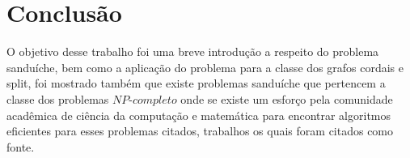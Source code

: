 \section{Conclusão}

O objetivo desse trabalho foi uma breve introdução a respeito do problema sanduíche, bem como a aplicação do problema para a classe dos grafos cordais e split, foi mostrado também que existe problemas sanduíche que pertencem a classe dos problemas $NP$-$completo$ onde se existe um esforço pela comunidade acadêmica de ciência da computação e matemática para encontrar algoritmos eficientes para esses problemas citados, trabalhos os quais foram citados como fonte.